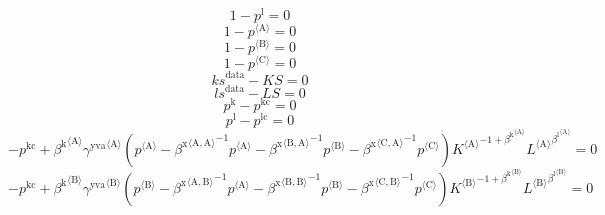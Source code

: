 \begin{equation}
1 - p^{\mathrm{l}} = 0
\end{equation}
\begin{equation}
1 - {p}^{\langle \mathrm{A}\rangle} = 0
\end{equation}
\begin{equation}
1 - {p}^{\langle \mathrm{B}\rangle} = 0
\end{equation}
\begin{equation}
1 - {p}^{\langle \mathrm{C}\rangle} = 0
\end{equation}
\begin{equation}
{k\!s}^{\mathrm{data}} - {K\!S} = 0
\end{equation}
\begin{equation}
{l\!s}^{\mathrm{data}} - {L\!S} = 0
\end{equation}
\begin{equation}
p^{\mathrm{k}} - p^{\mathrm{kc}} = 0
\end{equation}
\begin{equation}
p^{\mathrm{l}} - p^{\mathrm{lc}} = 0
\end{equation}
\begin{equation}
-p^{\mathrm{kc}} + {{\beta^{\mathrm{k}}}^{\langle \mathrm{\mathrm{A}}\rangle}} {{\gamma^{\mathrm{yva}}}^{\langle \mathrm{\mathrm{A}}\rangle}} \left({p}^{\langle \mathrm{A}\rangle} - {{\beta^{\mathrm{x}}}^{\langle \mathrm{\mathrm{A}},\mathrm{\mathrm{A}}\rangle}}^{-1} {{p}^{\langle \mathrm{A}\rangle}} - {{\beta^{\mathrm{x}}}^{\langle \mathrm{\mathrm{B}},\mathrm{\mathrm{A}}\rangle}}^{-1} {{p}^{\langle \mathrm{B}\rangle}} - {{\beta^{\mathrm{x}}}^{\langle \mathrm{\mathrm{C}},\mathrm{\mathrm{A}}\rangle}}^{-1} {{p}^{\langle \mathrm{C}\rangle}}\right) {{{K}^{\langle \mathrm{A}\rangle}}^{-1 + {\beta^{\mathrm{k}}}^{\langle \mathrm{\mathrm{A}}\rangle}}} {{{L}^{\langle \mathrm{A}\rangle}}^{{\beta^{\mathrm{l}}}^{\langle \mathrm{\mathrm{A}}\rangle}}} = 0
\end{equation}
\begin{equation}
-p^{\mathrm{kc}} + {{\beta^{\mathrm{k}}}^{\langle \mathrm{\mathrm{B}}\rangle}} {{\gamma^{\mathrm{yva}}}^{\langle \mathrm{\mathrm{B}}\rangle}} \left({p}^{\langle \mathrm{B}\rangle} - {{\beta^{\mathrm{x}}}^{\langle \mathrm{\mathrm{A}},\mathrm{\mathrm{B}}\rangle}}^{-1} {{p}^{\langle \mathrm{A}\rangle}} - {{\beta^{\mathrm{x}}}^{\langle \mathrm{\mathrm{B}},\mathrm{\mathrm{B}}\rangle}}^{-1} {{p}^{\langle \mathrm{B}\rangle}} - {{\beta^{\mathrm{x}}}^{\langle \mathrm{\mathrm{C}},\mathrm{\mathrm{B}}\rangle}}^{-1} {{p}^{\langle \mathrm{C}\rangle}}\right) {{{K}^{\langle \mathrm{B}\rangle}}^{-1 + {\beta^{\mathrm{k}}}^{\langle \mathrm{\mathrm{B}}\rangle}}} {{{L}^{\langle \mathrm{B}\rangle}}^{{\beta^{\mathrm{l}}}^{\langle \mathrm{\mathrm{B}}\rangle}}} = 0
\end{equation}
